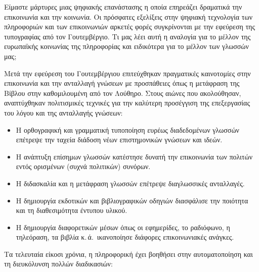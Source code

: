 \documentclass[]{../../metanetpaper}
\begin{document}
\begin{multicols}{2}
Είμαστε μάρτυρες μιας ψηφιακής επανάστασης η οποία επηρεάζει δραματικά την επικοινωνία και την κοινωνία. Οι πρόσφατες εξελίξεις στην ψηφιακή τεχνολογία των πληροφοριών και των επικοινωνιών αρκετές φορές συγκρίνονται με την εφεύρεση της τυπογραφίας από τον Γουτεμβέργιο. Τι μας λέει αυτή η αναλογία για το μέλλον της ευρωπαϊκής κοινωνίας της πληροφορίας και ειδικότερα για το μέλλον των γλωσσών μας;


Μετά την εφεύρεση του Γουτεμβέργιου επιτεύχθηκαν πραγματικές καινοτομίες στην επικοινωνία και την ανταλλαγή γνώσεων με προσπάθειες όπως η μετάφραση της Βίβλου στην καθομιλουμένη από τον Λούθηρο. Στους αιώνες που ακολούθησαν, αναπτύχθηκαν πολιτισμικές τεχνικές για την καλύτερη προσέγγιση της επεξεργασίας του λόγου και της ανταλλαγής γνώσεων:

\medskip
\begin{itemize}
\item Η ορθογραφική και γραμματική τυποποίηση ευρέως διαδεδομένων γλωσσών επέτρεψε την ταχεία διάδοση νέων επιστημονικών γνώσεων και ιδεών.
\item Η ανάπτυξη επίσημων γλωσσών κατέστησε δυνατή την επικοινωνία των πολιτών εντός ορισμένων (συχνά πολιτικών) συνόρων.
\item Η διδασκαλία και η μετάφραση γλωσσών επέτρεψε διαγλωσσικές ανταλλαγές.
\item Η δημιουργία εκδοτικών και βιβλιογραφικών οδηγιών διασφάλισε την ποιότητα και τη διαθεσιμότητα έντυπου υλικού.
\item Η δημιουργία διαφορετικών μέσων όπως οι εφημερίδες, το ραδιόφωνο, η τηλεόραση, τα βιβλία κ.\,ά.~ικανοποίησε διάφορες επικοινωνιακές ανάγκες.
\end{itemize}

Τα τελευταία είκοσι χρόνια, η πληροφορική έχει βοηθήσει στην αυτοματοποίηση και τη διευκόλυνση πολλών διαδικασιών:


\end{multicols}
\end{document}
